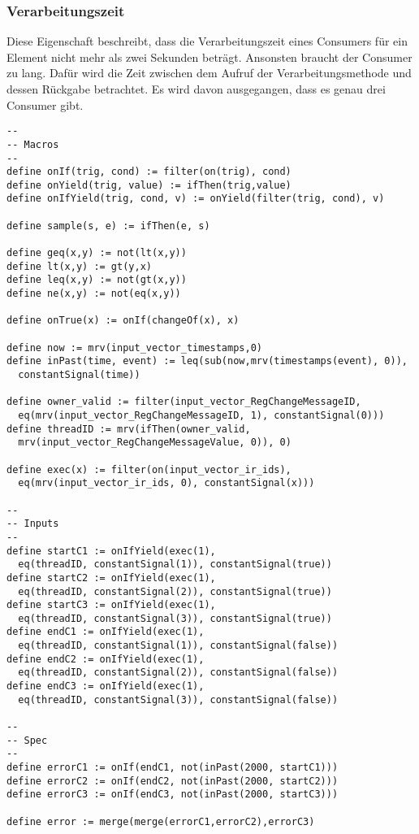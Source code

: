 \documentclass{article}
\begin{document}
\subsubsection{Verarbeitungszeit}

Diese Eigenschaft beschreibt, dass die Verarbeitungszeit eines Consumers für ein Element nicht mehr als zwei Sekunden beträgt. Ansonsten braucht der Consumer zu lang. Dafür wird die Zeit zwischen dem Aufruf der Verarbeitungsmethode und dessen Rückgabe betrachtet. Es wird davon ausgegangen, dass es genau drei Consumer gibt.

\begin{lstlisting}[language=tessla+salt]
--
-- Macros
--
define onIf(trig, cond) := filter(on(trig), cond)
define onYield(trig, value) := ifThen(trig,value)
define onIfYield(trig, cond, v) := onYield(filter(trig, cond), v)

define sample(s, e) := ifThen(e, s)

define geq(x,y) := not(lt(x,y))
define lt(x,y) := gt(y,x)
define leq(x,y) := not(gt(x,y))
define ne(x,y) := not(eq(x,y))

define onTrue(x) := onIf(changeOf(x), x)

define now := mrv(input_vector_timestamps,0)
define inPast(time, event) := leq(sub(now,mrv(timestamps(event), 0)),
  constantSignal(time))

define owner_valid := filter(input_vector_RegChangeMessageID, 
  eq(mrv(input_vector_RegChangeMessageID, 1), constantSignal(0)))
define threadID := mrv(ifThen(owner_valid, 
  mrv(input_vector_RegChangeMessageValue, 0)), 0)

define exec(x) := filter(on(input_vector_ir_ids), 
  eq(mrv(input_vector_ir_ids, 0), constantSignal(x)))

--
-- Inputs
--
define startC1 := onIfYield(exec(1), 
  eq(threadID, constantSignal(1)), constantSignal(true))
define startC2 := onIfYield(exec(1), 
  eq(threadID, constantSignal(2)), constantSignal(true))
define startC3 := onIfYield(exec(1), 
  eq(threadID, constantSignal(3)), constantSignal(true))
define endC1 := onIfYield(exec(1), 
  eq(threadID, constantSignal(1)), constantSignal(false))
define endC2 := onIfYield(exec(1), 
  eq(threadID, constantSignal(2)), constantSignal(false))
define endC3 := onIfYield(exec(1), 
  eq(threadID, constantSignal(3)), constantSignal(false))

--
-- Spec
--
define errorC1 := onIf(endC1, not(inPast(2000, startC1)))
define errorC2 := onIf(endC2, not(inPast(2000, startC2)))
define errorC3 := onIf(endC3, not(inPast(2000, startC3)))

define error := merge(merge(errorC1,errorC2),errorC3)
\end{lstlisting}
\end{document}
